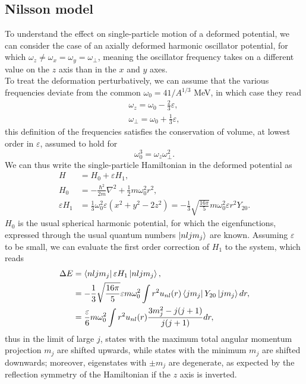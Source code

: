 \subsection{Nilsson model}
To understand the effect on single-particle motion of a deformed potential, we can consider the case of an axially deformed harmonic oscillator potential, for which $ \omega_z \neq \omega_x = \omega_y = \omega_\perp$, meaning the oscillator frequency takes on a different value on the $z$ axis than in the $x$ and $y$ axes.
\\To treat the deformation perturbatively, we can assume that the various frequencies deviate from the common $\omega_0=41/A^{1/3}$ MeV, in which case they read
\begin{align}
\omega_z = \omega_0 - \frac 2 3 \varepsilon,\\
\omega_\perp = \omega_0 + \frac 1 3 \varepsilon,
\end{align}
this definition of the frequencies satisfies the conservation of volume, at lowest order in $\varepsilon$, assumed to hold for 
\begin{equation}
    \label{eq:volume_cons}
    \omega_0 ^ 3 = \omega_z \omega_\perp^2.
\end{equation}
We can thus write the single-particle Hamiltonian in the deformed potential as
\begin{align}
    H&=H_0 +\varepsilon H_1,\\
    H_0 &= -\frac{\hbar^2}{2m}\nabla^2 + \frac 1 2 m \omega_0^2 r^2,\\
    \varepsilon H_1 &= \frac 1 3 \omega_0 ^2 \varepsilon (x^2 + y^2 -2z^2) = -\frac 1 3 \sqrt{\frac{16\pi}{5}}m\omega_0^2\varepsilon r^2 Y_{20}.
\end{align}
$H_0$ is the usual spherical harmonic potential, for which the eigenfunctions, expressed through the usual quantum numbers $\ket{nljm_j}$ are known. Assuming $\varepsilon$ to be small, we can evaluate the first order correction of $H_1$ to the system, which reads
\begin{align}
\Delta E &= \bra{nljm_j}\varepsilon H_1 \ket{nljm_j},
\\&= -\frac 1 3 \sqrt{\frac{16 \pi}{5}}\varepsilon m \omega_0^2 \int r^2 u_{nl}(r)\bra{jm_j} Y_{20}\ket{jm_j} dr,
\\&= \frac \varepsilon 6 m\omega_0^2 \int r^2 u_{nl}(r)\frac{3m_j^2 - j(j+1)}{j(j+1)}dr,
\end{align}
thus in the limit of large $j$, states with the maximum total angular momentum projection $m_j$ are shifted upwards, while states with the minimum $m_j$ are shifted downwards; moreover, eigenstates with $\pm m_j$ are degenerate, as expected by the reflection symmetry of the Hamiltonian if the $z$ axis is inverted.
